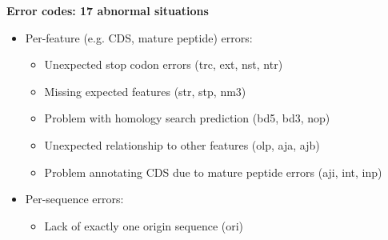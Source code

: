 \documentclass[landscape]{slides}
\begin{document}
\begin{slide}
\begin{center}
\textbf{Error codes: 17 abnormal situations}

\small
\begin{itemize}
\item Per-feature (e.g. CDS, mature peptide) errors:
\begin{itemize}
\item Unexpected stop codon errors (trc, ext, nst, ntr)
\item Missing expected features (str, stp, nm3)
\item Problem with homology search prediction (bd5, bd3, nop)
\item Unexpected relationship to other features (olp, aja, ajb)
\item Problem annotating CDS due to mature peptide errors (aji, int, inp)
\end{itemize}
\item Per-sequence errors:
\begin{itemize} 
\item Lack of exactly one origin sequence (ori)
\end{itemize}
\end{itemize}

\end{center}
\vfill
\end{slide}
\end{document}
